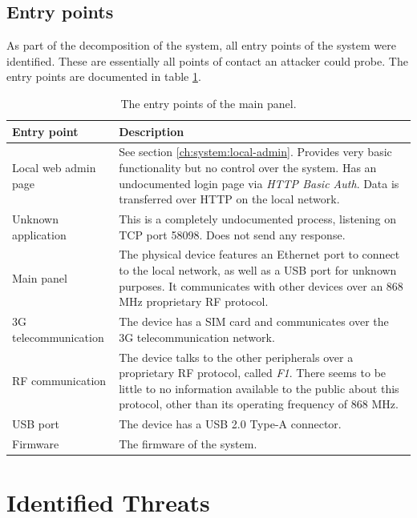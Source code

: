 \subsection{Entry points}
As part of the decomposition of the system, all entry points of the system were identified. These are essentially all points of contact an attacker could probe. The entry points are documented in table \ref{tb:entry-points}.
\begin{table}[!ht]
    \centering
    \begin{tabularx}{\textwidth}{l X}
        \hline
        \textbf{Entry point} & \textbf{Description}
        \\ \hline
        Local web admin page  & See section \ref{ch:system:local-admin}. Provides very basic functionality but no control over the system. Has an undocumented login page via \textit{HTTP Basic Auth}. Data is transferred over HTTP on the local network.
        \\ \hline
        Unknown application  & This is a completely undocumented process, listening on TCP port 58098. Does not send any response.
        \\ \hline
        Main panel  & The physical device features an Ethernet port to connect to the local network, as well as a USB port for unknown purposes. It communicates with other devices over an 868 MHz proprietary \gls{RF} protocol.
        \\ \hline
        3G telecommunication  & The device has a SIM card and communicates over the 3G telecommunication network.
        \\ \hline
        \gls{RF} communication  & The device talks to the other peripherals over a proprietary \gls{RF} protocol, called \textit{F1}. There seems to be little to no information available to the public about this protocol, other than its operating frequency of 868 MHz.
        \\ \hline
        USB port  & The device has a USB 2.0 Type-A connector.
        \\ \hline
        Firmware  & The firmware of the system.
        \\ \hline
    \end{tabularx}
    \caption{The entry points of the main panel.}
    \label{tb:entry-points}
\end{table}

\section{Identified Threats} \label{ch:threat-model:threats}
\newcommand{\owaspref}[1]{OWASP IoT \##1}
\newcommand{\etsiref}[1]{ETSI \##1}

